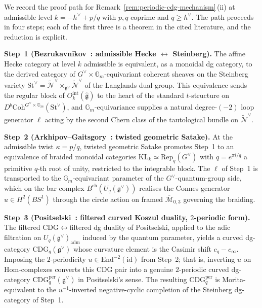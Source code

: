 \begin{remark}
\label{rem:periodic-cdg-proof-path}
We record the proof path for
Remark~\textup{\ref{rem:periodic-cdg-mechanism}}\,(ii) at admissible
level $k = -h^\vee + p/q$ with $p, q$ coprime and $q \geq h^\vee$.
The path proceeds in four steps; each of the first three is a theorem
in the cited literature, and the reduction is explicit.

\medskip
\noindent\textbf{Step~1 (Bezrukavnikov~\cite{Bezrukavnikov16}:
admissible Hecke $\leftrightarrow$ Steinberg).}
The affine Hecke category at level $k$ admissible is equivalent, as a
monoidal dg category, to the derived category of
$G^\vee \!\times\! \mathbb{G}_m$-equivariant coherent sheaves on the
Steinberg variety
$\mathrm{St}^\vee = \widetilde{\mathcal{N}}^\vee
\times_{\mathfrak{g}^\vee}\!\widetilde{\mathcal{N}}^\vee$
of the Langlands dual group. This equivalence sends the regular block
of $O^{\mathrm{int}}_k(\widehat{\mathfrak{g}})$ to the heart of the
standard $t$-structure on
$D^b\mathrm{Coh}^{G^\vee\!\times\!\mathbb{G}_m}(\mathrm{St}^\vee)$, and
$\mathbb{G}_m$-equivariance supplies a natural degree-$(-2)$ loop
generator $\ell$ acting by the second Chern class of the tautological
bundle on $\widetilde{\mathcal{N}}^\vee$.

\medskip
\noindent\textbf{Step~2 (Arkhipov--Gaitsgory~\cite{ArkhipovGaitsgory09}:
twisted geometric Satake).}
At the admissible twist $\kappa = p/q$, twisted geometric Satake
promotes Step~1 to an equivalence of braided monoidal categories
$\mathrm{KL}_k \simeq \mathrm{Rep}_q(G^\vee)$ with
$q = e^{\pi i / q}$ a primitive $q$-th root of unity, restricted to
the integrable block. The $\ell$ of Step~1 is transported to the
$\mathbb{G}_m$-equivariant parameter of the $G^\vee$-quantum-group
side, which on the bar complex
$B^{\mathrm{ch}}(U_q(\mathfrak{g}^\vee))$ realises the Connes
generator $u \in H^2(BS^1)$ through the circle action on framed
$\overline{\mathcal{M}}_{0,3}$ governing the braiding.

\medskip
\noindent\textbf{Step~3 (Positselski~\cite{Positselski11,Positselski18}:
filtered curved Koszul duality, $2$-periodic form).}
The filtered CDG$\leftrightarrow$filtered dg duality of Positselski,
applied to the adic filtration on
$U_q(\mathfrak{g}^\vee)_{\mathrm{adm}}$ induced by the quantum
parameter, yields a curved dg-category
$\mathrm{CDG}_q(\mathfrak{g}^\vee)$ whose curvature element is the
Casimir shift $c_q - c_\infty$. Imposing the $2$-periodicity
$u \in \mathrm{End}^{-2}(\mathrm{id})$ from Step~2; that is,
inverting $u$ on $\mathrm{Hom}$-complexes converts this CDG pair
into a genuine $2$-periodic curved dg-category
$\mathrm{CDG}_q^{\mathrm{per}}(\mathfrak{g}^\vee)$ in Positselski's
sense. The resulting $\mathrm{CDG}_q^{\mathrm{per}}$ is Morita-equivalent
to the $u^{-1}$-inverted negative-cyclic completion of the Steinberg
dg-category of Step~1.


\end{remark}

